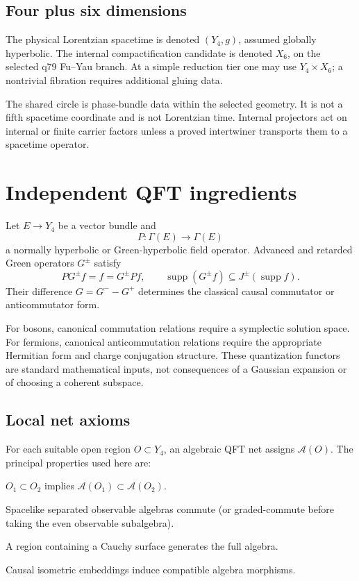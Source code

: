 \documentclass[11pt]{article}
\theoremstyle{definition}
\theoremstyle{remark}
\newcommand{\A}{\mathcal A}
\newcommand{\supp}{\operatorname{supp}}
\begin{document}
\subsection{Four plus six dimensions}

The physical Lorentzian spacetime is denoted
\((Y_4,g)\), assumed globally hyperbolic. The internal compactification
candidate is denoted \(X_6\), on the selected q79 Fu--Yau branch. At a simple
reduction tier one may use \(Y_4\times X_6\); a nontrivial fibration requires
additional gluing data.

The shared circle is phase-bundle data within the selected geometry. It is
not a fifth spacetime coordinate and is not Lorentzian time. Internal
projectors act on internal or finite carrier factors unless a proved
intertwiner transports them to a spacetime operator.

\section{Independent QFT ingredients}

Let \(E\to Y_4\) be a vector bundle and
\[
 P:\Gamma(E)\to\Gamma(E)
\]
a normally hyperbolic or Green-hyperbolic field operator. Advanced and
retarded Green operators \(G^\pm\) satisfy
\[
 PG^\pm f=f=G^\pm Pf,
 \qquad
 \supp(G^\pm f)\subseteq J^\pm(\supp f).
\]
Their difference \(G=G^- -G^+\) determines the classical causal
commutator or anticommutator form.

For bosons, canonical commutation relations require a symplectic solution
space. For fermions, canonical anticommutation relations require the
appropriate Hermitian form and charge conjugation structure. These
quantization functors are standard mathematical inputs, not consequences of
a Gaussian expansion or of choosing a coherent subspace.

\subsection{Local net axioms}

For each suitable open region \(O\subset Y_4\), an algebraic QFT net assigns
\(\A(O)\). The principal properties used here are:
\begin{description}[leftmargin=2.8cm,style=nextline]
\item[Isotony] \(O_1\subset O_2\) implies
\(\A(O_1)\subset\A(O_2)\).
\item[Einstein causality] Spacelike separated observable algebras commute
(or graded-commute before taking the even observable subalgebra).
\item[Time slice] A region containing a Cauchy surface generates the full
algebra.
\item[Local covariance] Causal isometric embeddings induce compatible
algebra morphisms.
\end{description}
\end{document}
